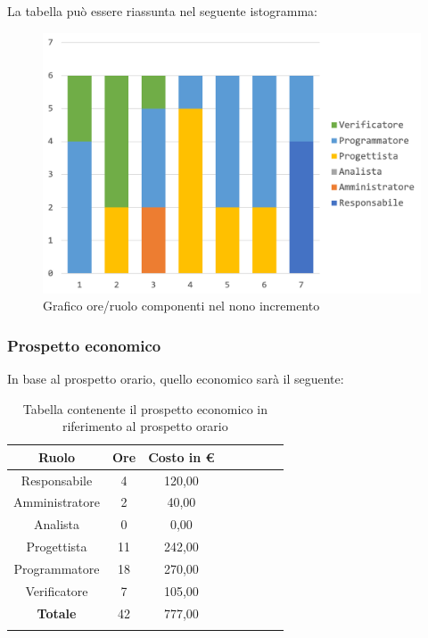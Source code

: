 		La tabella può essere riassunta nel seguente istogramma:
		\begin{figure}[H]
			\centering
			\includegraphics[width=0.8\linewidth]{./images/preventivo/incremento9-1.png}
			\caption{Grafico ore/ruolo componenti nel nono incremento}
			\label{fig:grafico suddivione ruoli incremento IX}
		\end{figure}
		
		\subsubsection{Prospetto economico}
		In base al prospetto orario, quello economico sarà il seguente: 
		
		\begin{longtable}{|c|c|c|c|c|c|c|c|}
			\hline
			\rowcolor{lighter-grayer}
			\textbf{Ruolo} & \textbf{Ore} & \textbf{Costo in € } \\
			\hline
			\endfirsthead
			
			\hline
			Responsabile 	    & 4 & 120,00\\
			\hline 
			\hline
			Amministratore	   & 2 & 40,00\\
			\hline
			\hline
			Analista 				& 0 & 0,00\\
			\hline
			\hline
			Progettista 		   & 11 & 242,00\\
			\hline
			\hline
			Programmatore 	  & 18 & 270,00\\
			\hline
			\hline
			Verificatore 		   & 7 & 105,00\\
			\hline
			\textbf{Totale} 	 & 42 & 777,00\\
			\hline
			\caption{Tabella contenente il prospetto economico in riferimento al prospetto orario}
		\end{longtable}
		\pagebreak
		
